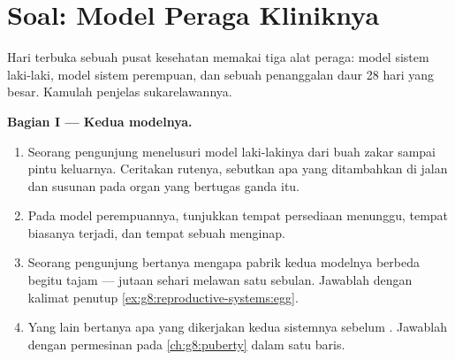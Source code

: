 \section{Soal: Model Peraga Kliniknya}

\begin{problem}\label{pb:g8:reproductive-systems:1}
Hari terbuka sebuah pusat kesehatan memakai tiga alat
peraga: model sistem laki-laki, model sistem perempuan, dan
sebuah penanggalan daur 28 hari yang besar. Kamulah
penjelas sukarelawannya.

\medskip\noindent\textbf{Bagian I --- Kedua modelnya.}
\begin{enumerate}
  \item Seorang pengunjung menelusuri model laki-lakinya
        dari buah zakar sampai pintu keluarnya. Ceritakan
        rutenya, sebutkan apa yang ditambahkan di jalan dan
        susunan pada organ yang bertugas ganda itu.
  \item Pada model perempuannya, tunjukkan tempat persediaan
         menunggu, tempat  biasanya
        terjadi, dan tempat sebuah  menginap.
  \item Seorang pengunjung bertanya mengapa pabrik 
        kedua modelnya berbeda begitu tajam --- jutaan
        sehari melawan satu sebulan. Jawablah dengan kalimat
        penutup \cref{ex:g8:reproductive-systems:egg}.
  \item Yang lain bertanya apa yang dikerjakan kedua
        sistemnya sebelum . Jawablah dengan
        permesinan pada \cref{ch:g8:puberty} dalam satu baris.
\end{enumerate}


\end{problem}
